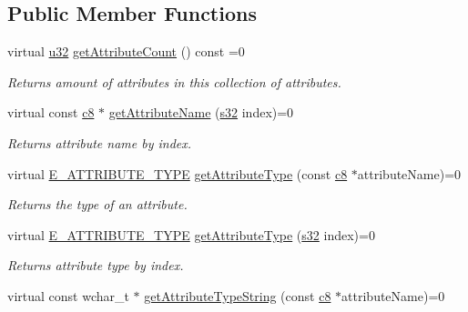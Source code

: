 \subsection*{Public Member Functions}
\begin{DoxyCompactItemize}
\item 
\mbox{\label{classirr_1_1io_1_1IAttributes_a796bdd9440ee7ba0b6742a90a82870b6}} 
virtual \hyperlink{namespaceirr_a0416a53257075833e7002efd0a18e804}{u32} \hyperlink{classirr_1_1io_1_1IAttributes_a796bdd9440ee7ba0b6742a90a82870b6}{get\+Attribute\+Count} () const =0
\begin{DoxyCompactList}\small\item\em Returns amount of attributes in this collection of attributes. \end{DoxyCompactList}\item 
virtual const \hyperlink{namespaceirr_a9395eaea339bcb546b319e9c96bf7410}{c8} $\ast$ \hyperlink{classirr_1_1io_1_1IAttributes_adee33f518d95a1ca17146bb055c6e5f3}{get\+Attribute\+Name} (\hyperlink{namespaceirr_ac66849b7a6ed16e30ebede579f9b47c6}{s32} index)=0
\begin{DoxyCompactList}\small\item\em Returns attribute name by index. \end{DoxyCompactList}\item 
virtual \hyperlink{namespaceirr_1_1io_a874a5f14dbe2e45c40c2bb29e9f0ebcb}{E\+\_\+\+A\+T\+T\+R\+I\+B\+U\+T\+E\+\_\+\+T\+Y\+PE} \hyperlink{classirr_1_1io_1_1IAttributes_af14805d54f8cfae0a76751d13931390a}{get\+Attribute\+Type} (const \hyperlink{namespaceirr_a9395eaea339bcb546b319e9c96bf7410}{c8} $\ast$attribute\+Name)=0
\begin{DoxyCompactList}\small\item\em Returns the type of an attribute. \end{DoxyCompactList}\item 
virtual \hyperlink{namespaceirr_1_1io_a874a5f14dbe2e45c40c2bb29e9f0ebcb}{E\+\_\+\+A\+T\+T\+R\+I\+B\+U\+T\+E\+\_\+\+T\+Y\+PE} \hyperlink{classirr_1_1io_1_1IAttributes_a2cb0eb3befcbf7feb2bbdd4676c53954}{get\+Attribute\+Type} (\hyperlink{namespaceirr_ac66849b7a6ed16e30ebede579f9b47c6}{s32} index)=0
\begin{DoxyCompactList}\small\item\em Returns attribute type by index. \end{DoxyCompactList}\item 
virtual const wchar\+\_\+t $\ast$ \hyperlink{classirr_1_1io_1_1IAttributes_a6a460acccdbf5b2f8eac8d2bd6a1e428}{get\+Attribute\+Type\+String} (const \hyperlink{namespaceirr_a9395eaea339bcb546b319e9c96bf7410}{c8} $\ast$attribute\+Name)=0

\end{DoxyCompactItemize}
